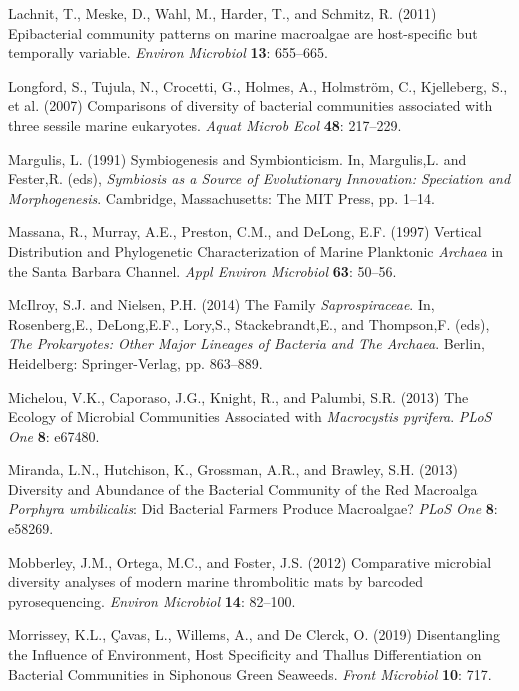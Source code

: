\documentclass[12pt,]{article}
\begin{document}
\leavevmode\hypertarget{ref-Lachnit2011}{}%
Lachnit, T., Meske, D., Wahl, M., Harder, T., and Schmitz, R. (2011)
Epibacterial community patterns on marine macroalgae are host-specific
but temporally variable. \emph{Environ Microbiol} \textbf{13}: 655--665.

\leavevmode\hypertarget{ref-Longford2007}{}%
Longford, S., Tujula, N., Crocetti, G., Holmes, A., Holmström, C.,
Kjelleberg, S., et al. (2007) Comparisons of diversity of bacterial
communities associated with three sessile marine eukaryotes. \emph{Aquat
Microb Ecol} \textbf{48}: 217--229.

\leavevmode\hypertarget{ref-Margulis1991}{}%
Margulis, L. (1991) Symbiogenesis and Symbionticism. In, Margulis,L. and
Fester,R. (eds), \emph{Symbiosis as a Source of Evolutionary Innovation:
Speciation and Morphogenesis}. Cambridge, Massachusetts: The MIT Press,
pp. 1--14.

\leavevmode\hypertarget{ref-Massana1997}{}%
Massana, R., Murray, A.E., Preston, C.M., and DeLong, E.F. (1997)
Vertical Distribution and Phylogenetic Characterization of Marine
Planktonic \emph{Archaea} in the Santa Barbara Channel. \emph{Appl
Environ Microbiol} \textbf{63}: 50--56.

\leavevmode\hypertarget{ref-McIlroy2014}{}%
McIlroy, S.J. and Nielsen, P.H. (2014) The Family \emph{Saprospiraceae}.
In, Rosenberg,E., DeLong,E.F., Lory,S., Stackebrandt,E., and Thompson,F.
(eds), \emph{The Prokaryotes: Other Major Lineages of Bacteria and The
Archaea}. Berlin, Heidelberg: Springer-Verlag, pp. 863--889.

\leavevmode\hypertarget{ref-Michelou2013}{}%
Michelou, V.K., Caporaso, J.G., Knight, R., and Palumbi, S.R. (2013) The
Ecology of Microbial Communities Associated with \emph{Macrocystis
pyrifera}. \emph{PLoS One} \textbf{8}: e67480.

\leavevmode\hypertarget{ref-Miranda2013}{}%
Miranda, L.N., Hutchison, K., Grossman, A.R., and Brawley, S.H. (2013)
Diversity and Abundance of the Bacterial Community of the Red Macroalga
\emph{Porphyra umbilicalis}: Did Bacterial Farmers Produce Macroalgae?
\emph{PLoS One} \textbf{8}: e58269.

\leavevmode\hypertarget{ref-Mobberley2012}{}%
Mobberley, J.M., Ortega, M.C., and Foster, J.S. (2012) Comparative
microbial diversity analyses of modern marine thrombolitic mats by
barcoded pyrosequencing. \emph{Environ Microbiol} \textbf{14}: 82--100.

\leavevmode\hypertarget{ref-Morrissey2019}{}%
Morrissey, K.L., Çavas, L., Willems, A., and De Clerck, O. (2019)
Disentangling the Influence of Environment, Host Specificity and Thallus
Differentiation on Bacterial Communities in Siphonous Green Seaweeds.
\emph{Front Microbiol} \textbf{10}: 717.
\end{document}
